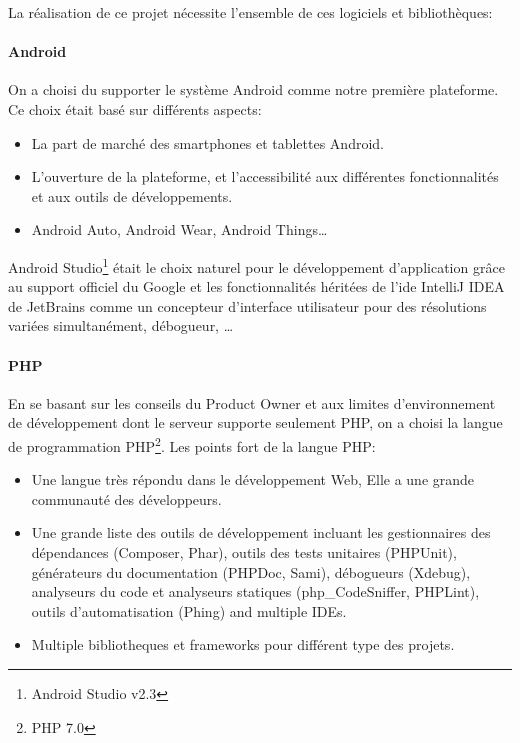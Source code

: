 La réalisation de ce projet nécessite l'ensemble de ces logiciels et
bibliothèques:

\paragraph{Android}

On a choisi du supporter le système Android comme notre première plateforme. Ce
choix était basé sur différents aspects:
\begin{itemize}
    \item La part de marché des smartphones et tablettes Android.
    \item L'ouverture de la plateforme, et l'accessibilité aux différentes
        fonctionnalités et aux outils de développements.
    \item Android Auto, Android Wear, Android Things\ldots
\end{itemize}

Android Studio\footnote{Android Studio v2.3} était le choix naturel pour le
développement d'application grâce au support officiel du Google et les
fonctionnalités héritées de l'ide IntelliJ IDEA de JetBrains comme un
concepteur d’interface utilisateur pour des résolutions variées simultanément,
débogueur, \ldots


\paragraph{PHP}
En se basant sur les conseils du Product Owner et aux limites d'environnement
de développement dont le serveur supporte seulement PHP, on a choisi la langue
de programmation PHP\footnote{PHP 7.0}.
Les points fort de la langue PHP:
\begin{itemize}
    \item Une langue très répondu dans le développement Web, Elle a une
        grande communauté des développeurs.
    \item Une grande liste des outils de développement incluant les
        gestionnaires des dépendances (Composer, Phar), outils des tests
        unitaires (PHPUnit), générateurs du documentation (PHPDoc, Sami),
        débogueurs (Xdebug), analyseurs du code et analyseurs statiques
        (php\_CodeSniffer, PHPLint), outils d'automatisation (Phing) and
        multiple IDEs.
    \item Multiple bibliotheques et frameworks pour différent type des projets.
\end{itemize}

